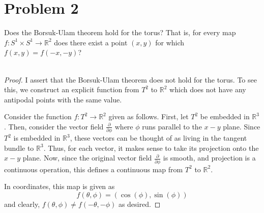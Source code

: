\documentclass[fontsize=11pt]{scrartcl} %
\numberwithin{equation}{section} %
\numberwithin{figure}{section} %
\numberwithin{table}{section} %
\newcommand{\R}{\mathbb{R}}
\begin{document}
\section*{Problem 2}
Does the Borsuk-Ulam theorem hold for the torus? That is, for every map
$f:S^1\times S^1 \to \R^2$ does there exist a point $(x,y)$ for which
$f(x,y) = f(-x,-y)$?
\\
\\
\begin{proof}
    I assert that the Borsuk-Ulam theorem does not hold for the torus. To see
    this, we construct an explicit function from $T^2$ to $\R^2$ which does not
    have any antipodal points with the same value.

    Consider the function $f:T^2\to \R^2$ given as follows. First, let $T^2$ be
    embedded in $\R^3$. Then, consider the vector field
    $\frac{\partial}{\partial\phi}$ where $\phi$ runs parallel to the $x-y$
    plane. Since $T^2$ is embedded in $\R^3$, these vectors can be thought of as
    living in the tangent bundle to $\R^3$. Thus, for each vector, it makes
    sense to take its projection onto the $x-y$ plane. Now, since the original
    vector field $\frac{\partial}{\partial \phi}$ is smooth, and projection is a
    continuous operation, this defines a continuous map from $T^2$ to $\R^2$.

    In coordinates, this map is given as
    \begin{equation}
        f(\theta,\phi) = (\cos(\phi),\sin(\phi))
    \end{equation}
    and clearly, $f(\theta,\phi)\neq f(-\theta,-\phi)$ as desired.
\end{proof}

\newpage
\end{document}
